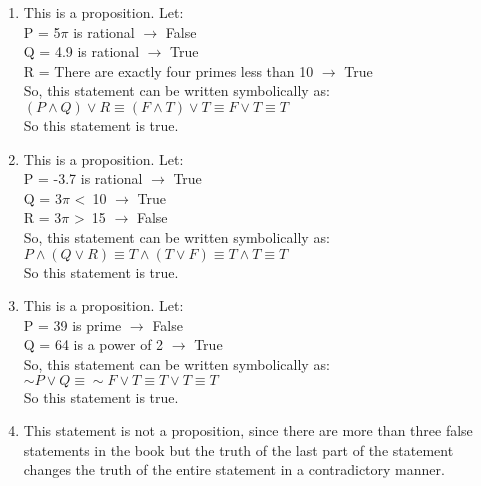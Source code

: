 \documentclass[12pt,letterpaper]{article}
\begin{document}
\begin{enumerate}[label= \textbf{\alph*)}]
	\item This is a proposition. Let: \\
	P = 5$\pi$ is rational $\rightarrow$ False\\
	Q = 4.9 is rational $\rightarrow$ True\\
	R = There are exactly four primes less than 10 $\rightarrow$ True\\
	So, this statement can be written symbolically as:\\
	$(P \land Q) \lor R \equiv (F \land T) \lor T \equiv F \lor T \equiv T$\\
	So this statement is true.

	\newpage

	\item This is a proposition. Let: \\
	P = -3.7 is rational $\rightarrow$ True\\
	Q = 3$\pi$ \textless \ 10 $\rightarrow$ True\\
	R = 3$\pi$ \textgreater \ 15 $\rightarrow$ False\\
	So, this statement can be written symbolically as:\\
	$P \land (Q \lor R) \equiv T \land (T \lor F) \equiv T \land T \equiv T$\\
	So this statement is true.

	\item This is a proposition. Let: \\
	P = 39 is prime $\rightarrow$ False\\
	Q = 64 is a power of 2 $\rightarrow$ True\\
	So, this statement can be written symbolically as:\\
	$\sim P \lor Q \equiv \sim F \lor T \equiv T \lor T \equiv T$\\
	So this statement is true.

	\item This statement is not a proposition, since there are more than three false statements in the book 
	but the truth of the last part of the statement changes the truth of the entire statement in a contradictory manner.

\end{enumerate}
\end{document}
